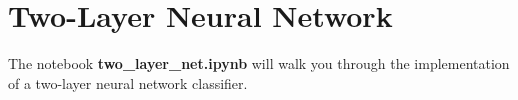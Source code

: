 \section{Two-Layer Neural Network}

The notebook \textbf{two\_layer\_net.ipynb} will walk you through the implementation of a two-layer neural network classifier.